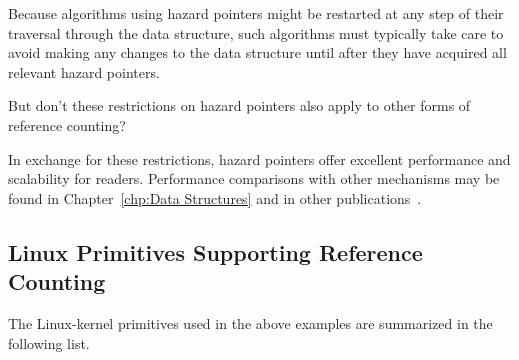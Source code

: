 Because algorithms using hazard pointers might be restarted at any
step of their traversal through the data structure, such algorithms
must typically take care to avoid making any changes to the data
structure until after they have acquired all relevant hazard pointers.

\QuickQuiz{}
	But don't these restrictions on hazard pointers also apply
	to other forms of reference counting?
 \QuickQuizEnd

In exchange for these restrictions, hazard pointers offer excellent
performance and scalability for readers.
Performance comparisons with other mechanisms may be found in
Chapter~\ref{chp:Data Structures}
and in other publications~\cite{ThomasEHart2007a,McKenney:2013:SDS:2483852.2483867,MagedMichael04a}.

\subsection{Linux Primitives Supporting Reference Counting}
\label{sec:defer:Linux Primitives Supporting Reference Counting}

The Linux-kernel primitives used in the above examples are
summarized in the following list.


